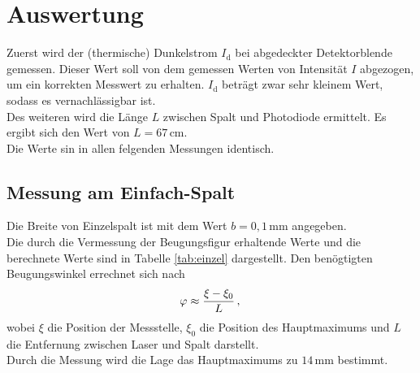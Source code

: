 \section{Auswertung}
\label{sec:Auswertung}
Zuerst wird der (thermische) Dunkelstrom  $I_\text{d}$ bei abgedeckter Detektorblende gemessen. 
Dieser Wert soll von dem gemessen Werten von Intensität $I$ abgezogen, um ein korrekten Messwert zu erhalten.
 $I_\text{d}$ beträgt zwar sehr kleinem Wert, sodass es vernachlässigbar ist.\\
 Des weiteren wird die Länge $L$ zwischen Spalt und Photodiode ermittelt. 
 Es ergibt sich den Wert von \(L=67 \, \text{cm}\).\\
Die Werte sin in allen felgenden Messungen identisch.
\subsection{Messung am Einfach-Spalt}
Die Breite von Einzelspalt ist mit dem Wert $b = 0,1 \, \text{mm}$ angegeben.\\
Die durch die Vermessung der Beugungsfigur erhaltende Werte und die berechnete Werte sind in Tabelle \ref{tab:einzel} dargestellt.
Den benögtigten Beugungswinkel errechnet sich nach
\begin{equation}
 \varphi \approx \frac{\xi-\xi_0}{L}\,,\\
    \end{equation}
wobei $\xi$ die Position der Messstelle, $\xi_0$ die Position des Hauptmaximums und
 $L$ die Entfernung zwischen Laser und Spalt darstellt.\\ 
Durch die Messung wird die Lage das Hauptmaximums zu $14\, \text{mm}$  bestimmt.
